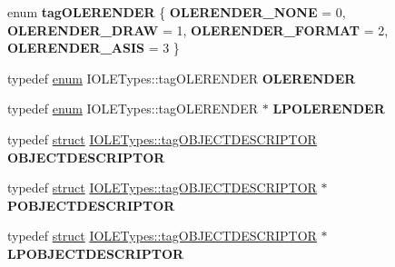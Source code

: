 \begin{DoxyCompactItemize}
\item 
\mbox{\label{interface_i_o_l_e_types_aff3225d555a69b49f573d7f764dfe764}} 
enum {\bfseries tag\+O\+L\+E\+R\+E\+N\+D\+ER} \{ {\bfseries O\+L\+E\+R\+E\+N\+D\+E\+R\+\_\+\+N\+O\+NE} = 0, 
{\bfseries O\+L\+E\+R\+E\+N\+D\+E\+R\+\_\+\+D\+R\+AW} = 1, 
{\bfseries O\+L\+E\+R\+E\+N\+D\+E\+R\+\_\+\+F\+O\+R\+M\+AT} = 2, 
{\bfseries O\+L\+E\+R\+E\+N\+D\+E\+R\+\_\+\+A\+S\+IS} = 3
 \}
\item 
\mbox{\label{interface_i_o_l_e_types_a25e897df69a5ee0bfb76e8ced50d9e2e}} 
typedef \hyperlink{interfaceenum}{enum} I\+O\+L\+E\+Types\+::tag\+O\+L\+E\+R\+E\+N\+D\+ER {\bfseries O\+L\+E\+R\+E\+N\+D\+ER}
\item 
\mbox{\label{interface_i_o_l_e_types_ad6ce6c1f9fd3bbfedc827d2178fca2fa}} 
typedef \hyperlink{interfaceenum}{enum} I\+O\+L\+E\+Types\+::tag\+O\+L\+E\+R\+E\+N\+D\+ER $\ast$ {\bfseries L\+P\+O\+L\+E\+R\+E\+N\+D\+ER}
\item 
\mbox{\label{interface_i_o_l_e_types_ae341b73c1cf2ba05c7d082a7f48f2222}} 
typedef \hyperlink{interfacestruct}{struct} \hyperlink{struct_i_o_l_e_types_1_1tag_o_b_j_e_c_t_d_e_s_c_r_i_p_t_o_r}{I\+O\+L\+E\+Types\+::tag\+O\+B\+J\+E\+C\+T\+D\+E\+S\+C\+R\+I\+P\+T\+OR} {\bfseries O\+B\+J\+E\+C\+T\+D\+E\+S\+C\+R\+I\+P\+T\+OR}
\item 
\mbox{\label{interface_i_o_l_e_types_a7d180da83edf340b3eede8ade5308277}} 
typedef \hyperlink{interfacestruct}{struct} \hyperlink{struct_i_o_l_e_types_1_1tag_o_b_j_e_c_t_d_e_s_c_r_i_p_t_o_r}{I\+O\+L\+E\+Types\+::tag\+O\+B\+J\+E\+C\+T\+D\+E\+S\+C\+R\+I\+P\+T\+OR} $\ast$ {\bfseries P\+O\+B\+J\+E\+C\+T\+D\+E\+S\+C\+R\+I\+P\+T\+OR}
\item 
\mbox{\label{interface_i_o_l_e_types_ad3ef7a1a3e4399312a8670c2c20881f6}} 
typedef \hyperlink{interfacestruct}{struct} \hyperlink{struct_i_o_l_e_types_1_1tag_o_b_j_e_c_t_d_e_s_c_r_i_p_t_o_r}{I\+O\+L\+E\+Types\+::tag\+O\+B\+J\+E\+C\+T\+D\+E\+S\+C\+R\+I\+P\+T\+OR} $\ast$ {\bfseries L\+P\+O\+B\+J\+E\+C\+T\+D\+E\+S\+C\+R\+I\+P\+T\+OR}
\item 
\mbox{\label{interface_i_o_l_e_types_aabec663f1255f93df5f99b6b9165fd3a}} 

\end{DoxyCompactItemize}
